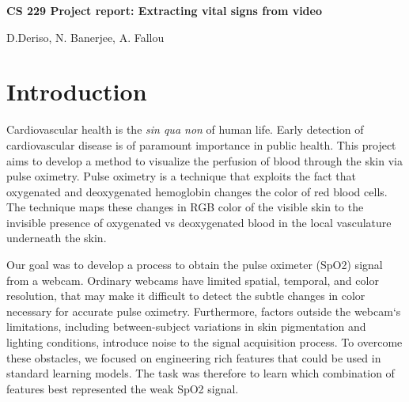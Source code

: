 \documentclass[12pt]{article}
\begin{document}
 \centerline{\Large \bf CS 229 Project report: Extracting vital signs from video} %

 \medskip

 \centerline{D.Deriso, N. Banerjee, A. Fallou}
 \bigskip
\thispagestyle{plain}
\begin{abstract}
In both developing and developed countries, reducing the cost of medical care is a primary goal of science and government. In this project we seek to find and extract information from a video of a human that tells us the pulse rate and the oxygen level of the blood, with the eventual aim to create a virtual pulse oximeter. Features to be extracted were chosen to be related to the three color channel intensity values, with the idea that changing color of the video would relate to blood flow around the body. Extensive pre-processing was required on both the video data and the pulse oximeter data to enable training. Early results showed that feature selection was vital in reducing the mean-squared error of the output. At the end of this report, we outline further work to be done.

\end{abstract}


\section{Introduction}
%
\small  

Cardiovascular health is the \emph{sin qua non} of human life. Early detection of cardiovascular disease is of paramount importance in public health. This project aims to develop a method to visualize the perfusion of blood through the skin via pulse oximetry. Pulse oximetry is a technique that exploits the fact that oxygenated and deoxygenated hemoglobin changes the color of red blood cells. The technique maps these changes in RGB color of the visible skin to the invisible presence of oxygenated vs deoxygenated blood in the local vasculature underneath the skin.

Our goal was to develop a process to obtain the pulse oximeter (SpO2) signal from a webcam. Ordinary webcams have limited spatial, temporal, and color resolution, that may make it difficult to detect the subtle changes in color necessary for accurate pulse oximetry. Furthermore, factors outside the webcam`s limitations, including between-subject variations in skin pigmentation and lighting conditions, introduce noise to the signal acquisition process. To overcome these obstacles, we focused on engineering rich features that could be used in standard learning models. The task was therefore to learn which combination of features best represented the weak SpO2 signal.
\end{document}
